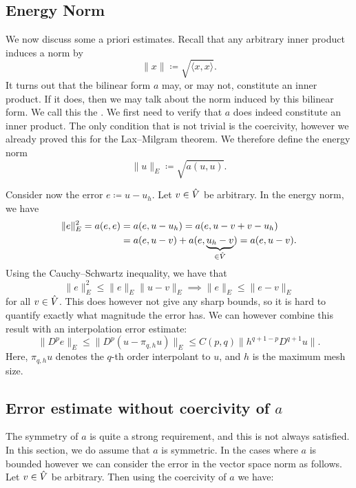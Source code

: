 \subsection{Energy Norm}
We now discuss some a priori estimates. Recall that any arbitrary inner product
induces a norm by
\begin{equation}
    \| x \| \coloneqq \sqrt{ \langle x, x \rangle }.
\end{equation}
It turns out that the bilinear form \( a \) may, or may not, constitute an
inner product. If it does, then we may talk about the norm induced by this
bilinear form.  We call this the . We first need to verify
that \( a \) does indeed constitute an inner product. The only condition that
is not trivial is the coercivity, however we already proved this for the
Lax--Milgram theorem. We therefore define the energy norm
\begin{equation}
    \|u\|_E \coloneqq \sqrt{a(u, u)}.
\end{equation}

Consider now the error \( e \coloneqq u - u_h \). Let \(v \in \hat{V}\) be
arbitrary. In the energy norm, we have
\begin{align}
    \| e \|_E^2 = a(e, e) &= a(e, u - u_h) = a(e, u - v + v - u_h) \\
                          &= a(e, u - v) + a(e, \underbrace{u_h - v}_{\in \hat{V}}) = a(e, u-v).
\end{align}
Using the Cauchy--Schwartz inequality, we have that
\begin{equation}
     \| e \|_E^2 \leq \|e\|_E \|u - v\|_E \implies \| e \|_E \leq \|e - v\|_E
\end{equation}
for all \( v \in \hat{V} \). This does however not give any sharp bounds, so it
is hard to quantify exactly what magnitude the error has. We can however
combine this result with an interpolation error estimate:
\begin{equation}
    \| D^p e \|_E \leq \| D^p(u - \pi_{q, h} u)\|_E \leq C(p, q) \| h^{q + 1-p}
    D^{q+1} u\|.
\end{equation}
Here, \( \pi_{q, h} u\) denotes the \( q \)-th order interpolant to \( u \),
and \( h \) is the maximum mesh size.


\subsection{Error estimate without coercivity of \(a\)}
\label{ssec:error_estimate_cea}
The symmetry of \( a \) is quite a strong requirement, and this is not always
satisfied. In this section, we do  assume that \( a \) is symmetric.
In the cases where \( a \) is bounded however we can consider the error in the
vector space norm as follows. Let \( v \in \hat{V} \) be arbitrary. Then using
the coercivity of \( a \) we have:

